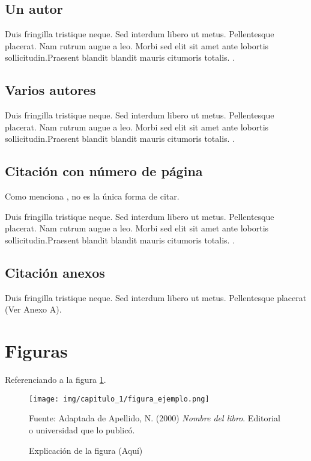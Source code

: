 \subsection*{Un autor}

Duis fringilla tristique neque. Sed interdum libero ut metus.
Pellentesque placerat. Nam rutrum augue a leo. Morbi sed 
elit sit amet ante lobortis sollicitudin.Praesent blandit 
blandit mauris citumoris totalis. \cite{libro:ejemplo}.

\subsection*{Varios autores}

Duis fringilla tristique neque. Sed interdum libero ut metus.
Pellentesque placerat. Nam rutrum augue a leo. Morbi sed 
elit sit amet ante lobortis sollicitudin.Praesent blandit 
blandit mauris citumoris totalis. \cite{libro:ejemplo_varios_autores}.

\subsection{Citación con número de página}

Como menciona , no es la única
forma de citar.

Duis fringilla tristique neque. Sed interdum libero ut metus.
Pellentesque placerat. Nam rutrum augue a leo. Morbi sed 
elit sit amet ante lobortis sollicitudin.Praesent blandit 
blandit mauris citumoris totalis. 
\cite[p.~7-12]{libro:ejemplo_varios_autores}.

\subsection{Citación anexos}
Duis fringilla tristique neque. Sed interdum libero ut metus.
Pellentesque placerat (Ver Anexo A).

\section{Figuras}
Referenciando a la figura \ref{fig:ejemplo}.

\begin{figure}[!h]
    \centering
    \texttt{[image: img/capitulo\_1/figura\_ejemplo.png]}
    \caption{Explicación de la figura (Aquí)}
    Fuente: Adaptada de Apellido, N. (2000) \textit{Nombre del libro}.
    Editorial o universidad que lo publicó.
    \label{fig:ejemplo}
\end{figure}

